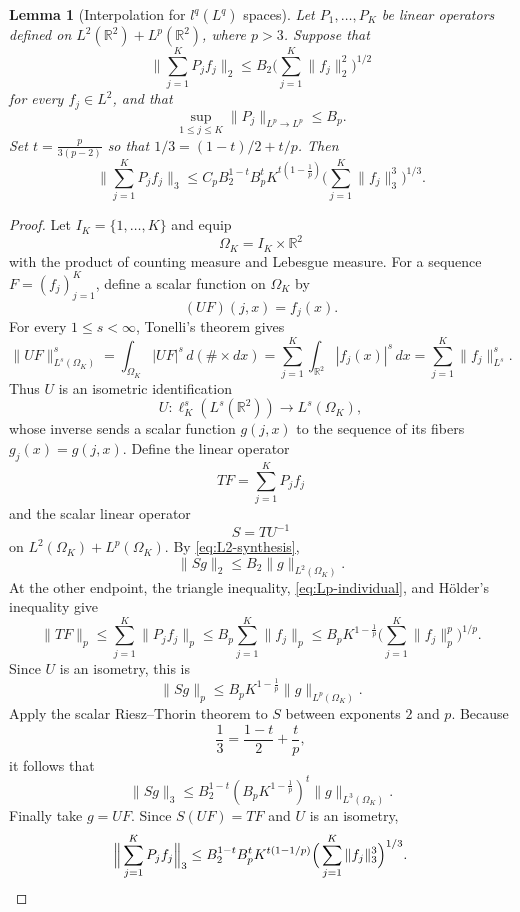 \documentclass{amsart}
\numberwithin{equation}{section}
\newtheorem{lemma}[theorem]{Lemma}
\newcommand{\R}{\mathbb{R}}
\begin{document}
\begin{lemma}[Interpolation for $l^q(L^q)$ spaces]\label{lem:synthesis-RT}
    Let $P_1,\ldots,P_K$ be linear operators defined on $L^2(\R^2)+L^p(\R^2)$, where $p>3$. 
    Suppose that
    \begin{equation}
        \label{eq:L2-synthesis}
        \Big\|\sum_{j=1}^KP_jf_j\Big\|_{2}
        \leq B_2\Big(\sum_{j=1}^K\|f_j\|_{2}^2\Big)^{1/2} 
    \end{equation}
    for every $f_j\in L^2$, and that
    \begin{equation}
        \label{eq:Lp-individual}
        \sup_{1\leq j\leq K}\|P_j\|_{L^p\to L^p}\leq B_p. 
    \end{equation}
    Set $t=\frac{p}{3(p-2)}$ so that $1/3=(1-t)/2+t/p$. 
    Then
    \begin{equation}
        \nonumber
        \Big\|\sum_{j=1}^KP_jf_j\Big\|_{3}
        \leq C_pB_2^{1-t}B_p^tK^{t(1-\frac{1}{p})}
        \Big(\sum_{j=1}^K\|f_j\|_{3}^3\Big)^{1/3}.
    \end{equation}
\end{lemma}

\begin{proof}
    Let $I_K=\{1,\ldots,K\}$ and equip
    \[
    \Omega_K=I_K\times\R^2
    \]
    with the product of counting measure and Lebesgue measure. For a sequence $F=(f_j)_{j=1}^K$, define a scalar function on $\Omega_K$ by
    \[
    (UF)(j,x)=f_j(x).
    \]
    For every $1\leq s<\infty$, Tonelli's theorem gives
    \[
    \|UF\|_{L^s(\Omega_K)}^s
    =\int_{\Omega_K}|UF|^s\,d(\#\times dx)
    =\sum_{j=1}^K\int_{\R^2}|f_j(x)|^s\,dx
    =\sum_{j=1}^K\|f_j\|_{L^s}^s.
    \]
    Thus $U$ is an isometric identification
    \[
    U:\ell_K^s(L^s(\R^2))\longrightarrow L^s(\Omega_K),
    \]
    whose inverse sends a scalar function $g(j,x)$ to the sequence of its fibers $g_j(x)=g(j,x)$.
    Define the linear operator
    \[
    TF=\sum_{j=1}^KP_jf_j
    \]
    and the scalar linear operator
    \[
    S=TU^{-1}
    \]
    on $L^2(\Omega_K)+L^p(\Omega_K)$. 
    By \eqref{eq:L2-synthesis},
    \[
    \|Sg\|_{2}\leq B_2\|g\|_{L^2(\Omega_K)}.
    \]
    At the other endpoint, the triangle inequality, \eqref{eq:Lp-individual}, and H\"older's inequality give
    \[
    \|TF\|_{p}
    \leq\sum_{j=1}^K\|P_jf_j\|_{p}
    \leq B_p\sum_{j=1}^K\|f_j\|_{p}
    \leq B_pK^{1-\frac{1}{p}}\Big(\sum_{j=1}^K\|f_j\|_{p}^p\Big)^{1/p}.
    \]
    Since $U$ is an isometry, this is
    \[
    \|Sg\|_{p}\leq B_pK^{1-\frac{1}{p}}\|g\|_{L^p(\Omega_K)}.
    \]
    Apply the scalar Riesz--Thorin theorem to $S$ between exponents $2$ and $p$. Because
    \[
    \frac13=\frac{1-t}{2}+\frac tp,
    \]
    it follows that
    \[
    \|Sg\|_{3}\leq B_2^{1-t}(B_pK^{1-\frac{1}{p}})^t\|g\|_{L^3(\Omega_K)}.
    \]
    Finally take $g=UF$. Since $S(UF)=TF$ and $U$ is an isometry,
    \[
    \Big\|\sum_{j=1}^KP_jf_j\Big\|_{3}
    \leq B_2^{1-t}B_p^tK^{t(1-1/p)}
    \Big(\sum_{j=1}^K\|f_j\|_{3}^3\Big)^{1/3}. \qedhere
    \]
\end{proof}
\end{document}
